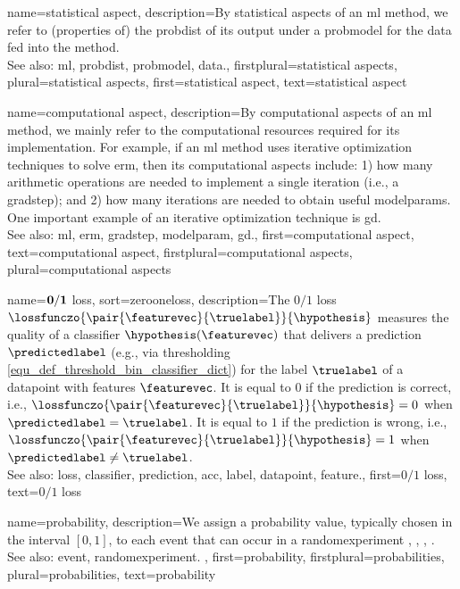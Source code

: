 {name={statistical aspect}, 
	description={By statistical aspects 
		of an \gls{ml} method, we refer to (properties of) the \gls{probdist} of its \gls{output} 
		under a \gls{probmodel} for the \gls{data} fed into the method.
					\\ 
		See also: \gls{ml}, \gls{probdist}, \gls{probmodel}, \gls{data}.},
	firstplural={statistical aspects},
	plural={statistical aspects},
	first={statistical aspect},
	text={statistical aspect}
}

{name={computational aspect}, 
	description={By computational 
		aspects of an \gls{ml} method, we mainly refer to the computational 
		resources required for its implementation. For example, if an \gls{ml} method uses iterative 
		\gls{optimization} techniques to solve \gls{erm}, then its computational aspects include: 1) how 
		many arithmetic operations are needed to implement a single \gls{iteration} (i.e., a \gls{gradstep}); 
		and 2) how many \glspl{iteration} are needed to obtain useful \glspl{modelparam}. One important 
		example of an iterative \gls{optimization} technique is \gls{gd}.
					\\ 
		See also: \gls{ml}, \gls{erm}, \gls{gradstep}, \gls{modelparam}, \gls{gd}.}, 
	first={computational aspect},
	text={computational aspect},
	firstplural={computational aspects},
	plural={computational aspects}
}

{name={$\bf 0/1$ loss},
sort={zerooneloss},
	description={The $0/1$ \gls{loss} $\lossfunczo{\pair{\featurevec}{\truelabel}}{\hypothesis}$ 
		measures the quality of a \gls{classifier} $\hypothesis(\featurevec)$ that delivers a 
		\gls{prediction} $\predictedlabel$ (e.g., via thresholding \eqref{equ_def_threshold_bin_classifier_dict}) 
		for the \gls{label} $\truelabel$ of a \gls{datapoint} with \glspl{feature} $\featurevec$. It is equal to $0$ if 
		the \gls{prediction} is correct, i.e., 
		$\lossfunczo{\pair{\featurevec}{\truelabel}}{\hypothesis}=0$ when $\predictedlabel=\truelabel$. It is 
		equal to $1$ if the \gls{prediction} is wrong, i.e., $\lossfunczo{\pair{\featurevec}{\truelabel}}{\hypothesis}=1$ 
		when $\predictedlabel\neq\truelabel$.
				\\ 
		See also: \gls{loss}, \gls{classifier}, \gls{prediction}, \gls{acc}, \gls{label}, \gls{datapoint}, \gls{feature}.},
    	first={$0/1$ loss},
	text={$0/1$ loss}
}

{name={probability}, 
	description={We assign a probability value, typically chosen in the 
		interval $[0,1]$, to each \gls{event} that can occur in a \gls{randomexperiment}  
		\cite{BillingsleyProbMeasure}, \cite{BertsekasProb}, \cite{KallenbergBook}, \cite{HalmosMeasure}.
		\\
		See also: \gls{event}, \gls{randomexperiment}. },
	first={probability},
	firstplural={probabilities},
	plural={probabilities},
	text={probability}
}
	
